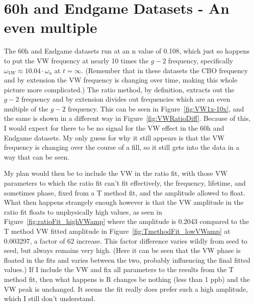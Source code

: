 \documentclass[12pt,letterpaper]{article}
\newcommand{\figref}[1]{Figure~\ref{#1}}
\def\gmtwo{$g-2$\xspace}
\begin{document}
\section{60h and Endgame Datasets - An even multiple}

The 60h and Endgame datasets run at an n value of 0.108, which just so happens to put the VW frequency at nearly 10 times the \gmtwo frequency, specifically $\omega_{VW} \approx 10.04 \cdot \omega_{a}$ at $t = \infty$. (Remember that in these datasets the CBO frequency and by extension the VW frequency is changing over time, making this whole picture more complicated.) The ratio method, by definition, extracts out the \gmtwo frequency and by extension divides out frequencies which are an even multiple of the \gmtwo frequency. This can be seen in \figref{fig:VW1x-10x}, and the same is shown in a different way in \figref{fig:VWRatioDiff}. Because of this, I would expect for there to be no signal for the VW effect in the 60h and Endgame datasets. My only guess for why it still appears is that the VW frequency is changing over the course of a fill, so it still gets into the data in a way that can be seen. 








My plan would then be to include the VW in the ratio fit, with those VW parameters to which the ratio fit can't fit effectively, the frequency, lifetime, and sometimes phase, fixed from a T method fit, and the amplitude allowed to float. What then happens strangely enough however is that the VW amplitude in the ratio fit floats to unphysically high values, as seen in \figref{fig:ratioFit_highVWamp} where the amplitude is 0.2043 compared to the T method VW fitted amplitude in \figref{fig:TmethodFit_lowVWamp} at 0.003297, a factor of 62 increase. This factor difference varies wildly from seed to seed, but always remains very high. (Here it can be seen that the VW phase is floated in the fits and varies between the two, probably influencing the final fitted values.) If I include the VW and fix all parameters to the results from the T method fit, then what happens is R changes be nothing (less than 1 ppb) and the VW peak is unchanged. It seems the fit really does prefer such a high amplitude, which I still don't understand.
\end{document}

